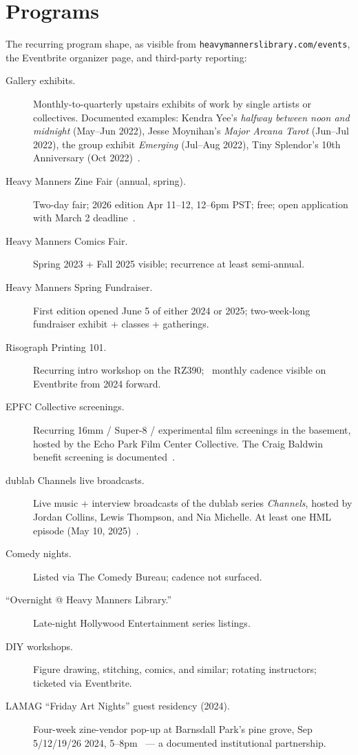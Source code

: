 \documentclass[10pt,letterpaper,twocolumn]{article}
\begin{document}
\section{Programs}

The recurring program shape, as visible from \texttt{heavymannerslibrary.com/events}, the Eventbrite organizer page, and third-party reporting:

\begin{description}
\item[Gallery exhibits.] Monthly-to-quarterly upstairs exhibits of work by single artists or collectives. Documented examples: Kendra Yee's \emph{halfway between noon and midnight} (May--Jun 2022), Jesse Moynihan's \emph{Major Arcana Tarot} (Jun--Jul 2022), the group exhibit \emph{Emerging} (Jul--Aug 2022), Tiny Splendor's 10th Anniversary (Oct 2022)~\citep{hmlsite}.
\item[Heavy Manners Zine Fair (annual, spring).] Two-day fair; 2026 edition Apr 11--12, 12--6pm PST; free; open application with March 2 deadline~\citep{hmlzinefair2026}.
\item[Heavy Manners Comics Fair.] Spring 2023 + Fall 2025 visible; recurrence at least semi-annual.
\item[Heavy Manners Spring Fundraiser.] First edition opened June 5 of either 2024 or 2025; two-week-long fundraiser exhibit + classes + gatherings.
\item[Risograph Printing 101.] Recurring intro workshop on the RZ390; ~monthly cadence visible on Eventbrite from 2024 forward.
\item[EPFC Collective screenings.] Recurring 16mm / Super-8 / experimental film screenings in the basement, hosted by the Echo Park Film Center Collective. The Craig Baldwin benefit screening is documented~\citep{hyperallergic2024indie}.
\item[dublab Channels live broadcasts.] Live music + interview broadcasts of the dublab series \emph{Channels}, hosted by Jordan Collins, Lewis Thompson, and Nia Michelle. At least one HML episode (May 10, 2025)~\citep{dublabchannels2025}.
\item[Comedy nights.] Listed via The Comedy Bureau; cadence not surfaced.
\item[``Overnight @ Heavy Manners Library.''] Late-night Hollywood Entertainment series listings.
\item[DIY workshops.] Figure drawing, stitching, comics, and similar; rotating instructors; ticketed via Eventbrite.
\item[LAMAG ``Friday Art Nights'' guest residency (2024).] Four-week zine-vendor pop-up at Barnsdall Park's pine grove, Sep 5/12/19/26 2024, 5--8pm~\citep{lamag2024} --- a documented institutional partnership.
\end{description}
\end{document}
